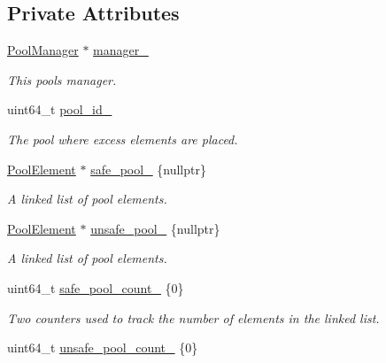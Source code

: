 \subsection*{Private Attributes}
\begin{DoxyCompactItemize}
\item 
\hyperlink{classtervel_1_1util_1_1memory_1_1rc_1_1_pool_manager}{Pool\+Manager} $\ast$ \hyperlink{classtervel_1_1util_1_1memory_1_1rc_1_1_descriptor_pool_a571b9eb199df3356d66d3a8137ad9944}{manager\+\_\+}
\begin{DoxyCompactList}\small\item\em This pool\textquotesingle{}s manager. \end{DoxyCompactList}\item 
uint64\+\_\+t \hyperlink{classtervel_1_1util_1_1memory_1_1rc_1_1_descriptor_pool_adec7cbd5e692812b0aa0afefa04697d7}{pool\+\_\+id\+\_\+}
\begin{DoxyCompactList}\small\item\em The pool where excess elements are placed. \end{DoxyCompactList}\item 
\hyperlink{classtervel_1_1util_1_1memory_1_1rc_1_1_pool_element}{Pool\+Element} $\ast$ \hyperlink{classtervel_1_1util_1_1memory_1_1rc_1_1_descriptor_pool_a816f71722b9a18b007154e27bdb153bd}{safe\+\_\+pool\+\_\+} \{nullptr\}
\begin{DoxyCompactList}\small\item\em A linked list of pool elements. \end{DoxyCompactList}\item 
\hyperlink{classtervel_1_1util_1_1memory_1_1rc_1_1_pool_element}{Pool\+Element} $\ast$ \hyperlink{classtervel_1_1util_1_1memory_1_1rc_1_1_descriptor_pool_a850e99b50092270ccc5e8529cffe294b}{unsafe\+\_\+pool\+\_\+} \{nullptr\}
\begin{DoxyCompactList}\small\item\em A linked list of pool elements. \end{DoxyCompactList}\item 
uint64\+\_\+t \hyperlink{classtervel_1_1util_1_1memory_1_1rc_1_1_descriptor_pool_a121f3c807724ee68f21faf5e659c2cf7}{safe\+\_\+pool\+\_\+count\+\_\+} \{0\}
\begin{DoxyCompactList}\small\item\em Two counters used to track the number of elements in the linked list. \end{DoxyCompactList}\item 
uint64\+\_\+t \hyperlink{classtervel_1_1util_1_1memory_1_1rc_1_1_descriptor_pool_a8b8a73ac56132217ea75bd6f5d13ba98}{unsafe\+\_\+pool\+\_\+count\+\_\+} \{0\}
\end{DoxyCompactItemize}


